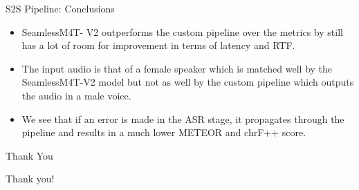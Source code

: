 \documentclass{beamer}
\begin{document}
\begin{frame}{S2S Pipeline: Conclusions}
\begin{itemize}
\item SeamlessM4T- V2 outperforms the custom pipeline over the metrics by still has a lot of room for improvement in terms of latency and RTF.
\item The input audio is that of a female speaker which is matched well by the SeamlessM4T-V2 model but not as well by the custom pipeline which outputs the audio in a male voice.
\item We see that if an error is made in the ASR stage, it propagates through the pipeline and results in a much lower METEOR and chrF++ score.
\end{itemize}
\end{frame}

\begin{frame}{Thank You}
\begin{center}
{\Large Thank you!}
\end{center}
\end{frame}
\end{document}

